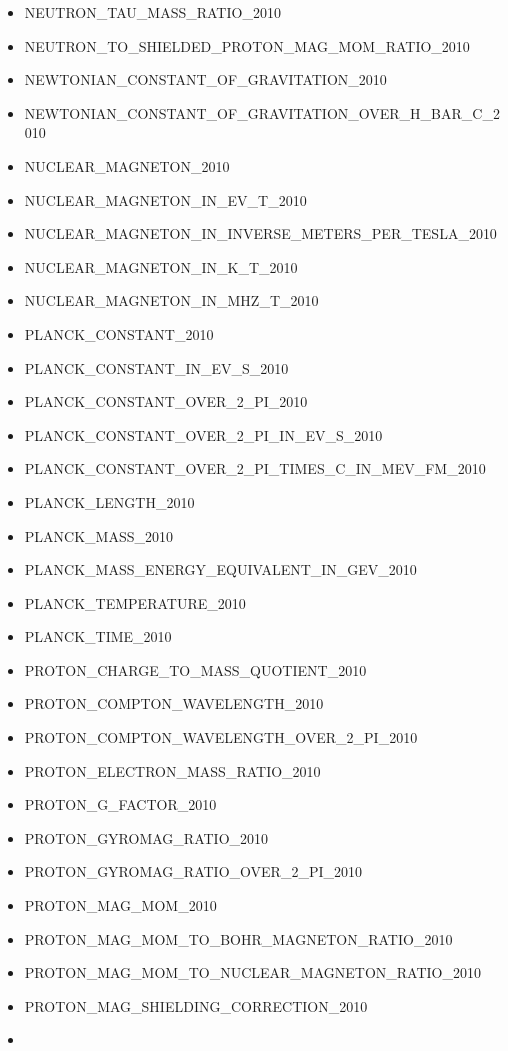 \begin{itemize}
\item
  NEUTRON\_TAU\_MASS\_RATIO\_2010
\item
  NEUTRON\_TO\_SHIELDED\_PROTON\_MAG\_MOM\_RATIO\_2010
\item
  NEWTONIAN\_CONSTANT\_OF\_GRAVITATION\_2010
\item
  NEWTONIAN\_CONSTANT\_OF\_GRAVITATION\_OVER\_H\_BAR\_C\_2010
\item
  NUCLEAR\_MAGNETON\_2010
\item
  NUCLEAR\_MAGNETON\_IN\_EV\_T\_2010
\item
  NUCLEAR\_MAGNETON\_IN\_INVERSE\_METERS\_PER\_TESLA\_2010
\item
  NUCLEAR\_MAGNETON\_IN\_K\_T\_2010
\item
  NUCLEAR\_MAGNETON\_IN\_MHZ\_T\_2010
\item
  PLANCK\_CONSTANT\_2010
\item
  PLANCK\_CONSTANT\_IN\_EV\_S\_2010
\item
  PLANCK\_CONSTANT\_OVER\_2\_PI\_2010
\item
  PLANCK\_CONSTANT\_OVER\_2\_PI\_IN\_EV\_S\_2010
\item
  PLANCK\_CONSTANT\_OVER\_2\_PI\_TIMES\_C\_IN\_MEV\_FM\_2010
\item
  PLANCK\_LENGTH\_2010
\item
  PLANCK\_MASS\_2010
\item
  PLANCK\_MASS\_ENERGY\_EQUIVALENT\_IN\_GEV\_2010
\item
  PLANCK\_TEMPERATURE\_2010
\item
  PLANCK\_TIME\_2010
\item
  PROTON\_CHARGE\_TO\_MASS\_QUOTIENT\_2010
\item
  PROTON\_COMPTON\_WAVELENGTH\_2010
\item
  PROTON\_COMPTON\_WAVELENGTH\_OVER\_2\_PI\_2010
\item
  PROTON\_ELECTRON\_MASS\_RATIO\_2010
\item
  PROTON\_G\_FACTOR\_2010
\item
  PROTON\_GYROMAG\_RATIO\_2010
\item
  PROTON\_GYROMAG\_RATIO\_OVER\_2\_PI\_2010
\item
  PROTON\_MAG\_MOM\_2010
\item
  PROTON\_MAG\_MOM\_TO\_BOHR\_MAGNETON\_RATIO\_2010
\item
  PROTON\_MAG\_MOM\_TO\_NUCLEAR\_MAGNETON\_RATIO\_2010
\item
  PROTON\_MAG\_SHIELDING\_CORRECTION\_2010
\item

\end{itemize}
